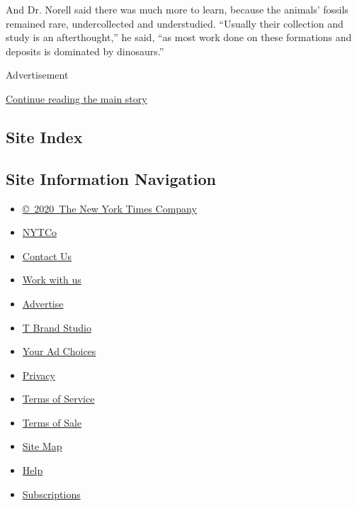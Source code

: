 And Dr. Norell said there was much more to learn, because the animals'
fossils remained rare, undercollected and understudied. ``Usually their
collection and study is an afterthought,'' he said, ``as most work done
on these formations and deposits is dominated by dinosaurs.''

Advertisement

\protect\hyperlink{after-bottom}{Continue reading the main story}

\hypertarget{site-index}{%
\subsection{Site Index}\label{site-index}}

\hypertarget{site-information-navigation}{%
\subsection{Site Information
Navigation}\label{site-information-navigation}}

\begin{itemize}
\tightlist
\item
  \href{https://help.nytimes3xbfgragh.onion/hc/en-us/articles/115014792127-Copyright-notice}{©~2020~The
  New York Times Company}
\end{itemize}

\begin{itemize}
\tightlist
\item
  \href{https://www.nytco.com/}{NYTCo}
\item
  \href{https://help.nytimes3xbfgragh.onion/hc/en-us/articles/115015385887-Contact-Us}{Contact
  Us}
\item
  \href{https://www.nytco.com/careers/}{Work with us}
\item
  \href{https://nytmediakit.com/}{Advertise}
\item
  \href{http://www.tbrandstudio.com/}{T Brand Studio}
\item
  \href{https://www.nytimes3xbfgragh.onion/privacy/cookie-policy\#how-do-i-manage-trackers}{Your
  Ad Choices}
\item
  \href{https://www.nytimes3xbfgragh.onion/privacy}{Privacy}
\item
  \href{https://help.nytimes3xbfgragh.onion/hc/en-us/articles/115014893428-Terms-of-service}{Terms
  of Service}
\item
  \href{https://help.nytimes3xbfgragh.onion/hc/en-us/articles/115014893968-Terms-of-sale}{Terms
  of Sale}
\item
  \href{https://spiderbites.nytimes3xbfgragh.onion}{Site Map}
\item
  \href{https://help.nytimes3xbfgragh.onion/hc/en-us}{Help}
\item
  \href{https://www.nytimes3xbfgragh.onion/subscription?campaignId=37WXW}{Subscriptions}
\end{itemize}
